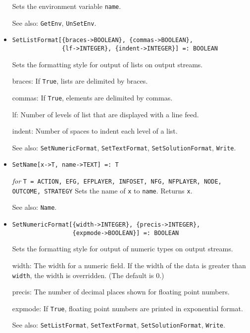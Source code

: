 \begin{itemize}
\bd
Sets the environment variable \verb+name+.
\item [See also:] \verb+GetEnv+, \verb+UnSetEnv+.
\ed

\item
\protect \large \begin{verbatim}
SetListFormat[{braces->BOOLEAN}, {commas->BOOLEAN},
              {lf->INTEGER}, {indent->INTEGER}] =: BOOLEAN
\end{verbatim} \normalsize

\bd
Sets the formatting style for output of lists on output streams.
\bd
\item [braces:] If \verb+True+, lists are delimited by braces.
\item [commas:] If \verb+True+, elements are delimited by commas.
\item [lf:] Number of levels of list that are displayed with a line feed.
\item [indent:] Number of spaces to indent each level of a list.
\ed
\item [See also:] \verb+SetNumericFormat+, \verb+SetTextFormat+,
\verb+SetSolutionFormat+, \verb+Write+.
\ed

\item
\protect \large \begin{verbatim}
SetName[x->T, name->TEXT] =: T
\end{verbatim}\normalsize

{\it for} {\tt T = ACTION, EFG, EFPLAYER, INFOSET, NFG, NFPLAYER,
NODE, OUTCOME, STRATEGY}
\bd
Sets the name of \verb+x+ to \verb+name+.  Returns \verb+x+.
\item [See also:] \verb+Name+.
\ed

\item
\protect \large \begin{verbatim}
SetNumericFormat[{width->INTEGER}, {precis->INTEGER},
                 {expmode->BOOLEAN}] =: BOOLEAN
\end{verbatim}\normalsize

\bd
Sets the formatting style for output of numeric types on output streams.
\bd
\item [width:] The width for a numeric field.  If the width of the
data is greater than \verb+width+, the width is overridden.  (The
default is 0.)
\item [precis:] The number of decimal places shown for floating point
numbers.
\item [expmode:] If \verb+True+, floating point numbers are printed in
exponential format.
\ed
\item [See also:] \verb+SetListFormat+, \verb+SetTextFormat+, 
\verb+SetSolutionFormat+, \verb+Write+.
\ed


\end{itemize}
